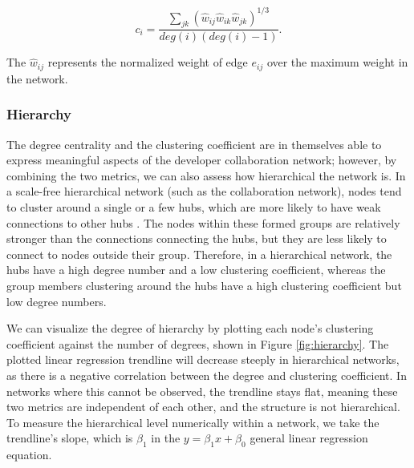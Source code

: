 \[ c_i = \frac{\sum_{jk}(\hat{w}_{ij}\hat{w}_{ik}\hat{w}_{jk})^{1/3}}{deg(i)(deg(i)-1)}. \]

The $\hat{w}_{ij}$ represents the normalized weight of edge $e_{ij}$ over the maximum weight in the network.

\subsubsection{Hierarchy}
\label{sec:hierarchy}

The degree centrality and the clustering coefficient are in themselves able to express meaningful aspects of the developer collaboration network; however, by combining the two metrics, we can also assess how hierarchical the network is. In a scale-free hierarchical network (such as the collaboration network), nodes tend to cluster around a single or a few hubs, which are more likely to have weak connections to other hubs \cite{ravaszHierarchicalOrganizationComplex2003, joblinEvolutionaryTrendsDeveloper2017}. The nodes within these formed groups are relatively stronger than the connections connecting the hubs, but they are less likely to connect to nodes outside their group. Therefore, in a hierarchical network, the hubs have a high degree number and a low clustering coefficient, whereas the group members clustering around the hubs have a high clustering coefficient but low degree numbers.

We can visualize the degree of hierarchy by plotting each node's clustering coefficient against the number of degrees, shown in Figure \ref{fig:hierarchy}. The plotted linear regression trendline will decrease steeply in hierarchical networks, as there is a negative correlation between the degree and clustering coefficient. In networks where this cannot be observed, the trendline stays flat, meaning these two metrics are independent of each other, and the structure is not hierarchical. To measure the hierarchical level numerically within a network, we take the trendline's slope, which is $\beta_1$ in the $y=\beta_1x + \beta_0$ general linear regression equation.

